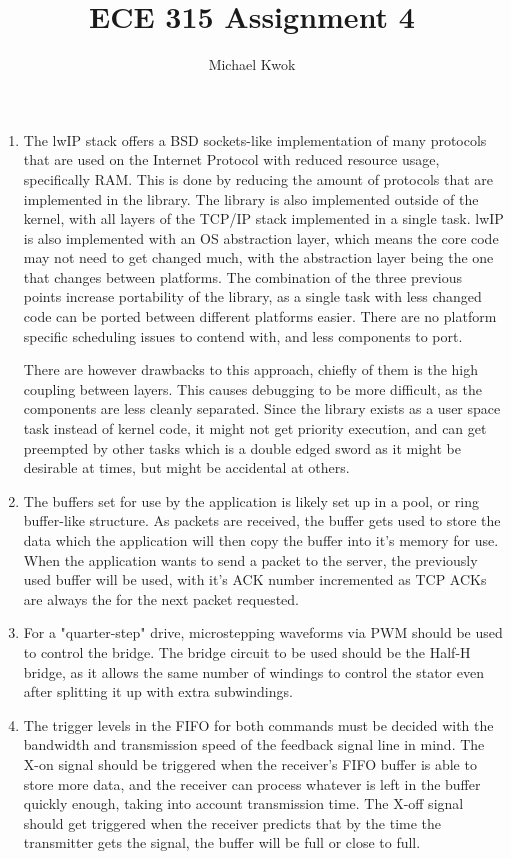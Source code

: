 \documentclass{article}
\title{ECE 315 Assignment 4}
\author{Michael Kwok}
\begin{document}
\maketitle
\begin{enumerate}
      \item The lwIP stack offers a BSD sockets-like implementation of many protocols that are used on the Internet Protocol with reduced resource usage, specifically RAM. This is done by reducing the amount of protocols that are implemented in the library. The library is also implemented outside of the kernel, with all layers of the TCP/IP stack implemented in a single task. lwIP is also implemented with an OS abstraction layer, which means the core code may not need to get changed much, with the abstraction layer being the one that changes between platforms. The combination of the three previous points increase portability of the library, as a single task with less changed code can be ported between different platforms easier. There are no platform specific scheduling issues to contend with, and less components to port.

            There are however drawbacks to this approach, chiefly of them is the high coupling between layers. This causes debugging to be more difficult, as the components are less cleanly separated. Since the library exists as a user space task instead of kernel code, it might not get priority execution, and can get preempted by other tasks which is a double edged sword as it might be desirable at times, but might be accidental at others.

      \item The buffers set for use by the application is likely set up in a pool, or ring buffer-like structure. As packets are received, the buffer gets used to store the data which the application will then copy the buffer into it's memory for use. When the application wants to send a packet to the server, the previously used buffer will be used, with it's ACK number incremented as TCP ACKs are always the for the next packet requested.

      \item For a "quarter-step" drive, microstepping waveforms via PWM should be used to control the bridge. The bridge circuit to be used should be the Half-H bridge, as it allows the same number of windings to control the stator even after splitting it up with extra subwindings.

      \item The trigger levels in the FIFO for both commands must be decided with the bandwidth and transmission speed of the feedback signal line in mind. The X-on signal should be triggered when the receiver's FIFO buffer is able to store more data, and the receiver can process whatever is left in the buffer quickly enough, taking into account transmission time. The X-off signal should get triggered when the receiver predicts that by the time the transmitter gets the signal, the buffer will be full or close to full.


\end{enumerate}
\end{document}
